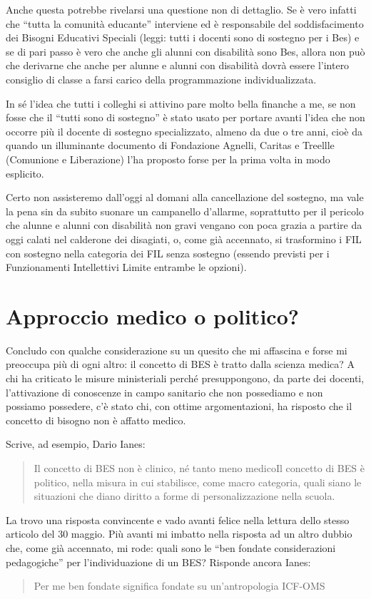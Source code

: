 Anche questa potrebbe rivelarsi una questione non di dettaglio. Se è vero infatti che “tutta la comunità educante” interviene ed è responsabile del soddisfacimento dei Bisogni Educativi Speciali (leggi: tutti i docenti sono di sostegno per i Bes) e se di pari passo è vero che anche gli alunni con disabilità sono Bes, allora non può che derivarne che anche per alunne e alunni con disabilità dovrà essere l'intero consiglio di classe a farsi carico della programmazione individualizzata.

In sé l'idea che tutti i colleghi si attivino pare molto bella finanche a me, se non fosse che il “tutti sono di sostegno” è stato usato per portare avanti l'idea che non occorre più il docente di sostegno specializzato, almeno da due o tre anni, cioè da quando un illuminante documento di Fondazione Agnelli, Caritas e Treellle (Comunione e Liberazione) l'ha proposto forse per la prima volta in modo esplicito.

Certo non assisteremo dall'oggi al domani alla cancellazione del sostegno, ma vale la pena sin da subito suonare un campanello d'allarme, soprattutto per il pericolo che alunne e alunni con disabilità non gravi vengano con poca grazia a partire da oggi calati nel calderone dei disagiati, o, come già accennato, si trasformino i FIL con sostegno nella categoria dei FIL senza sostegno (essendo previsti per i Funzionamenti Intellettivi Limite entrambe le opzioni).

\section*{Approccio medico o politico?}
Concludo con qualche considerazione su un quesito che mi affascina e forse mi preoccupa più di ogni altro: il concetto di BES è tratto dalla scienza medica? A chi ha criticato le misure ministeriali perché presuppongono, da parte dei docenti, l'attivazione di conoscenze in campo sanitario che non possediamo e non possiamo possedere, c'è stato chi, con ottime argomentazioni, ha risposto che il concetto di bisogno non è affatto medico.

Scrive, ad esempio, Dario Ianes:
\begin{quote}
	Il concetto di BES non è clinico, né tanto meno medico\mancatesto Il concetto di BES è politico, nella misura in cui stabilisce, come macro categoria, quali siano le situazioni che diano diritto a forme di personalizzazione nella scuola.
\end{quote}

La trovo una risposta convincente e vado avanti felice nella lettura dello stesso articolo del 30 maggio. Più avanti mi imbatto nella risposta ad un altro dubbio che, come già accennato, mi rode: quali sono le “ben fondate considerazioni pedagogiche” per l'individuazione di un BES? Risponde ancora Ianes:
\begin{quote}
Per me ben fondate significa fondate su un'antropologia ICF-OMS\mancatesto
\end{quote}

